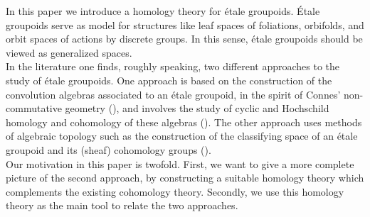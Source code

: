 \documentclass[a4paper]{article}
\begin{document}
\hspace*{.15in}In this paper we introduce a homology theory for \'etale groupoids. \'Etale groupoids serve as model for structures like leaf spaces of foliations, orbifolds, and orbit spaces of actions by discrete groups. In this sense, \'etale groupoids should be viewed as generalized spaces.\\
\hspace*{.3in} In the literature one finds, roughly speaking, two different approaches to the study of \'etale groupoids. One approach is based on the construction of the convolution algebras associated to an \'etale groupoid, in the spirit of Connes' non-commutative geometry (\cite{CoOp, Co3}), and involves the study of cyclic and Hochschild homology and cohomology of these algebras (\cite{BrNi, Co3}). The other approach uses methods of algebraic topology such as the construction of the classifying space of an \'etale groupoid and its (sheaf) cohomology groups (\cite{Bo, Ha2, Fourier}).\\
\hspace*{.3in} Our motivation in this paper is twofold. First, we want to give a more complete picture of the second approach, by constructing a suitable homology theory which complements the existing cohomology theory. Secondly, we use this homology theory as the main tool to relate the two approaches.\\
\end{document}
